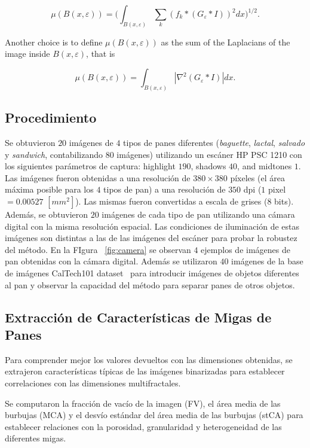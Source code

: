 \begin{equation}
\mu(B(x,\varepsilon)) = (\int_{B(x,\varepsilon)}{\sum_{k}{(f_{k} \ast (G_{\varepsilon} \ast I))^{2}} dx)^{1/2}}.
\label{eqn:gradient}
\end{equation}

Another choice is to define $\mu(B(x, \varepsilon))$ as the sum of the Laplacians of the image inside $B(x, \varepsilon)$, that is

\begin{equation}
\mu(B(x,\varepsilon)) = \int_{B(x,\varepsilon)}|\nabla^2 (G_{\varepsilon} \ast I)| dx.
\label{eqn:laplacian}
\end{equation}

\subsection{Procedimiento}
Se obtuvieron $20$ imágenes de $4$ tipos de panes diferentes ({\em baguette}, {\em lactal}, {\em salvado} y {\em sandwich}, contabilizando $80$ imágenes) utilizando un escáner HP PSC 1210 con los siguientes parámetros de captura:  highlight $190$, shadows $40$, and midtones $1$. Las imágenes fueron obtenidas a una resolución de $380\times 380$ píxeles (el área máxima posible para los $4$ tipos de pan) a una resolución de $350$ dpi ($1$ pixel $= 0.00527$ $[mm^{2}]$). Las mismas fueron convertidas a escala de grises ($8$ bits). Además, se obtuvieron $20$ imágenes de cada tipo de pan utilizando una cámara digital con la misma resolución espacial. Las condiciones de iluminación de estas imágenes son distintas a las de las imágenes del escáner para probar la robustez del método. En la FIgura ~\ref{fig:camera} se observan $4$ ejemplos de imágenes de pan obtenidas con la cámara digital. Además se utilizaron $40$ imágenes de la base de imágenes CalTech101 dataset~\cite{FeiFei04} para introducir imágenes de objetos diferentes al pan y observar la capacidad del método para separar panes de otros objetos.

\subsection{Extracción de Características de Migas de Panes}
Para comprender mejor los valores devueltos con las dimensiones obtenidas, se extrajeron características típicas de las imágenes binarizadas para establecer correlaciones con las dimensiones multifractales.

Se computaron la fracción de vacío de la imagen (FV), el área media de las burbujas (MCA) y el desvío estándar del área media de las burbujas (stCA) para establecer relaciones con la porosidad, granularidad y heterogeneidad de las diferentes migas.


